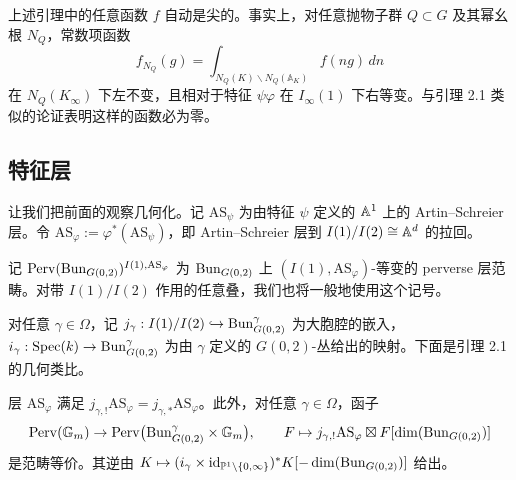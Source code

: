 \begin{remark}
上述引理中的任意函数 $f$ 自动是尖的。事实上，对任意抛物子群 $Q\subset G$ 及其幂幺根 $N_Q$，常数项函数
\[
f_{N_Q}(g)=\int_{N_Q(K)\backslash N_Q(\mathbb{A}_K)}f(ng)\,dn
\]
在 $N_Q(K_\infty)$ 下左不变，且相对于特征 $\psi\varphi$ 在 $I_\infty(1)$ 下右等变。与引理 2.1 类似的论证表明这样的函数必为零。
\end{remark}

\subsection{特征层}

让我们把前面的观察几何化。记 $\mathrm{AS}_\psi$ 为由特征 $\psi$ 定义的 $\mathbb{A}^1$ 上的 Artin--Schreier 层。令 $\mathrm{AS}_\varphi:=\varphi^*(\mathrm{AS}_\psi)$，即 Artin--Schreier 层到 $I(1)/I(2)\cong\mathbb{A}^d$ 的拉回。

记 $\mathrm{Perv}(\mathrm{Bun}_{G(0,2)})^{I(1),\mathrm{AS}_\varphi}$ 为 $\mathrm{Bun}_{G(0,2)}$ 上 $(I(1),\mathrm{AS}_\varphi)$-等变的 perverse 层范畴。对带 $I(1)/I(2)$ 作用的任意叠，我们也将一般地使用这个记号。

对任意 $\gamma\in\Omega$，记 $j_\gamma:I(1)/I(2)\hookrightarrow\mathrm{Bun}^\gamma_{G(0,2)}$ 为大胞腔的嵌入，$i_\gamma:\operatorname{Spec}(k)\to\mathrm{Bun}^\gamma_{G(0,2)}$ 为由 $\gamma$ 定义的 $G(0,2)$-丛给出的映射。下面是引理 2.1 的几何类比。

\begin{lemma}
层 $\mathrm{AS}_\varphi$ 满足 $j_{\gamma,!}\mathrm{AS}_\varphi=j_{\gamma,*}\mathrm{AS}_\varphi$。此外，对任意 $\gamma\in\Omega$，函子
\[
\mathrm{Perv}(\mathbb{G}_m)\to\mathrm{Perv}\big(\mathrm{Bun}^\gamma_{G(0,2)}\times\mathbb{G}_m\big),\qquad
F\mapsto j_{\gamma,!}\mathrm{AS}_\varphi\boxtimes F[\dim(\mathrm{Bun}_{G(0,2)})]
\]
是范畴等价。其逆由 $K\mapsto(i_\gamma\times\mathrm{id}_{\mathbb{P}^1\setminus\{0,\infty\}})^*K[-\dim(\mathrm{Bun}_{G(0,2)})]$ 给出。
\end{lemma}

